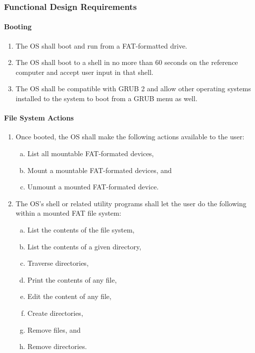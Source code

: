 
\subsubsection{Functional Design Requirements}
  \paragraph{Booting}
  \begin{enumerate}
    \item The OS shall boot and run from a FAT-formatted drive.
    \item The OS shall boot to a shell in no more than 60 seconds on the reference computer and accept user input in that shell.
    \item The OS shall be compatible with GRUB 2 and allow other operating systems installed to the system to boot from a GRUB menu as well.  
  \end{enumerate}
  \paragraph{File System Actions}
  \begin{enumerate}
    \item Once booted, the OS shall make the following actions available to the user:
    \begin{enumerate}[(a)]
      \item List all mountable FAT-formated devices,
      \item Mount a mountable FAT-formated devices, and
      \item Unmount a mounted FAT-formated device.
    \end{enumerate}
    \item The OS's shell or related utility programs shall let the user do the
      following within a mounted FAT file system:
    \begin{enumerate}[(a)]
      \item List the contents of the file system,
      \item List the contents of a given directory,
      \item Traverse directories,
      \item Print the contents of any file,
      \item Edit the content of any file,
      \item Create directories,
      \item Remove files, and
      \item Remove directories.
    \end{enumerate}
  \end{enumerate}
